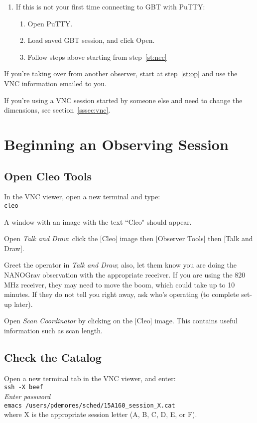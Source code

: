 \documentclass[11pt, reqno, tbtags]{article}
\begin{document}
\begin{enumerate}
 \item If this is not your first time connecting to GBT with PuTTY:
 \begin{enumerate}
  \item Open PuTTY.
  \item Load saved GBT session, and click Open.
  \item Follow steps above starting from step~\ref{st:nec}
 \end{enumerate}
\end{enumerate}

\noindent If you're taking over from another observer, start at step~\ref{st:op} and use the VNC information emailed to you.

\noindent If you're using a VNC session started by someone else and need to change the dimensions, see section~\ref{sssec:vnc}. 



\section{Beginning an Observing Session} \label{sec:begin}  %

\subsection{Open Cleo Tools}\label{ssec:cleo}  %
In the VNC viewer, open a new terminal and type: \\
\indent\texttt{cleo}

\noindent A window with an image with the text ``Cleo" should appear. 

\noindent Open \textit{Talk and Draw}: click the [Cleo] image then [Observer Tools] then [Talk and Draw].

\noindent Greet the operator in \textit{Talk and Draw}; also, let them know you are doing the NANOGrav observation with the appropriate receiver. If you are using the 820\,MHz receiver, they may need to move the boom, which could take up to 10 minutes.  If they do not tell you right away, ask who's operating (to complete set-up later).  

\noindent Open \textit{Scan Coordinator} by clicking on the [Cleo] image.  This contains useful information such as scan length. 

\subsection{Check the Catalog}\label{ssec:cat}  %
Open a new terminal tab in the VNC viewer, and enter: \\
\indent\texttt{ssh -X beef} \\
\indent \emph{Enter password} \\
\indent\texttt{emacs /users/pdemores/sched/15A160\_session\_X.cat} \\
where X is the appropriate session letter (A, B, C, D, E, or F).                                    
\end{document}
